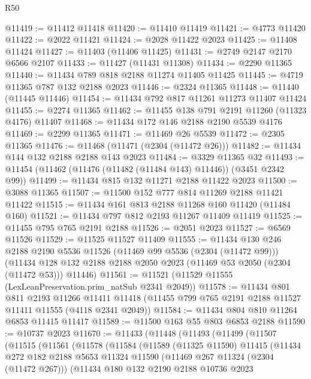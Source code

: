 \begin{lexlean}{R50}
\begin{coremodule}
@11419 := @11412 @11418
@11420 := @11410 @11419
@11421 := @4773 @11420
@11422 := @2022 @11421
@11424 := @2028 @11422 @2023
@11425 := @11408 @11424
@11427 := @11403 (@11406 @11425)
@11431 := @2749 @2147 @2170 @6566 @2107
@11433 := @11427 (@11431 @11308)
@11434 := @2290 @11365
@11440 := @11434 @789 @818 @2188 @11274 @11405 @11425
@11445 := @4719 @11365 @787 @132 @2188 @2023
@11446 := @2324 @11365
@11448 := @11440 (@11445 @11446)
@11454 := @11434 @792 @817 @11261 @11273 @11407 @11424
@11455 := @2274 @11365
@11462 := @11455 @138 @791 @2191 @11260 (@11323 @4176) @11407
@11468 := @11434 @172 @146 @2188 @2190 @5539 @4176
@11469 := @2299 @11365
@11471 := @11469 @26 @5539
@11472 := @2305 @11365
@11476 := @11468 (@11471 (@2304 (@11472 @26)))
@11482 := @11434 @144 @132 @2188 @2188 @143 @2023
@11484 := @3329 @11365 @32
@11493 := @11454 (@11462 (@11476 (@11482 (@11484 @143) @11446)) (@3451 @2342 @99))
@11499 := @11434 @815 @132 @11271 @2188 @11422 @2023
@11500 := @3088 @11365
@11507 := @11500 @152 @777 @814 @11269 @2188 @11421 @11422
@11515 := @11434 @161 @813 @2188 @11268 @160 @11420 (@11484 @160)
@11521 := @11434 @797 @812 @2193 @11267 @11409 @11419
@11525 := @11455 @795 @765 @2191 @2188
@11526 := @2051 @2023
@11527 := @6569 @11526
@11529 := @11525 @11527 @11409
@11555 := @11434
    @130
    @246
    @2188
    @2190
    @5536
    @11526
    (@11469 @99 @5536 (@2304 (@11472 @99)))
    (@11434 @128 @132 @2188 @2188 @2050 @2023 (@11469 @53 @2050 (@2304 (@11472 @53))) @11446)
@11561 := @11521 (@11529 @11555 (LexLeanPreservation.prim_natSub @2341 @2049))
@11578 := @11434
    @801
    @811
    @2193
    @11266
    @11411
    @11418
    (@11455 @799 @765 @2191 @2188 @11527 @11411 @11555 (@4118 @2341 @2049))
@11584 := @11434 @804 @810 @11264 @6853 @11415 @11417
@11589 := @11500 @163 @55 @803 @6853 @2188
@11590 := @10737 @2023
@11670 := @11433
    (@11448
      (@11493
        (@11499
          (@11507
            (@11515
              (@11561
                (@11578
                  (@11584
                    (@11589
                      (@11325 @11590)
                      @11415
                      (@11434
                        @272
                        @182
                        @2188
                        @5653
                        @11324
                        @11590
                        (@11469 @267 @11324 (@2304 (@11472 @267)))
                        (@11434
                          @180
                          @132
                          @2190
                          @2188
                          @10736
                          @2023

\end{coremodule}
\end{lexlean}
